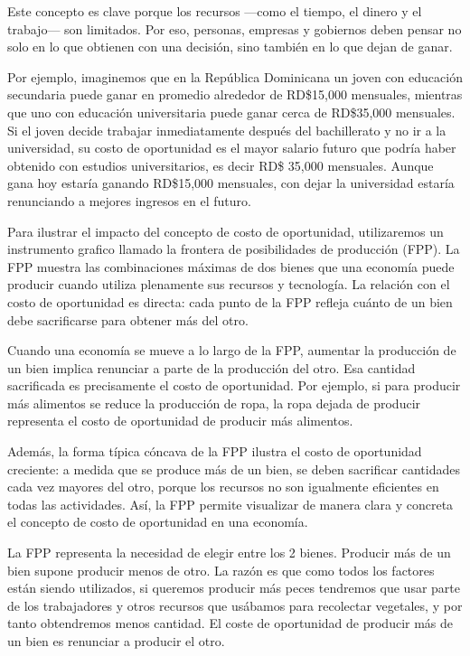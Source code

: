 \documentclass[
  letterpaper,
  DIV=11,
  numbers=noendperiod,
  oneside]{scrreprt}
\begin{document}
Este concepto es clave porque los recursos ---como el tiempo, el dinero
y el trabajo--- son limitados. Por eso, personas, empresas y gobiernos
deben pensar no solo en lo que obtienen con una decisión, sino también
en lo que dejan de ganar.

Por ejemplo, imaginemos que en la República Dominicana un joven con
educación secundaria puede ganar en promedio alrededor de RD\$15,000
mensuales, mientras que uno con educación universitaria puede ganar
cerca de RD\$35,000 mensuales. Si el joven decide trabajar
inmediatamente después del bachillerato y no ir a la universidad, su
costo de oportunidad es el mayor salario futuro que podría haber
obtenido con estudios universitarios, es decir RD\$ 35,000 mensuales.
Aunque gana hoy estaría ganando RD\$15,000 mensuales, con dejar la
universidad estaría renunciando a mejores ingresos en el futuro.

Para ilustrar el impacto del concepto de costo de oportunidad,
utilizaremos un instrumento grafico llamado la frontera de posibilidades
de producción (FPP). La FPP muestra las combinaciones máximas de dos
bienes que una economía puede producir cuando utiliza plenamente sus
recursos y tecnología. La relación con el costo de oportunidad es
directa: cada punto de la FPP refleja cuánto de un bien debe
sacrificarse para obtener más del otro.

Cuando una economía se mueve a lo largo de la FPP, aumentar la
producción de un bien implica renunciar a parte de la producción del
otro. Esa cantidad sacrificada es precisamente el costo de oportunidad.
Por ejemplo, si para producir más alimentos se reduce la producción de
ropa, la ropa dejada de producir representa el costo de oportunidad de
producir más alimentos.

Además, la forma típica cóncava de la FPP ilustra el costo de
oportunidad creciente: a medida que se produce más de un bien, se deben
sacrificar cantidades cada vez mayores del otro, porque los recursos no
son igualmente eficientes en todas las actividades. Así, la FPP permite
visualizar de manera clara y concreta el concepto de costo de
oportunidad en una economía.

La FPP representa la necesidad de elegir entre los 2 bienes. Producir
más de un bien supone producir menos de otro. La razón es que como todos
los factores están siendo utilizados, si queremos producir más peces
tendremos que usar parte de los trabajadores y otros recursos que
usábamos para recolectar vegetales, y por tanto obtendremos menos
cantidad. El coste de oportunidad de producir más de un bien es
renunciar a producir el otro.
\end{document}
